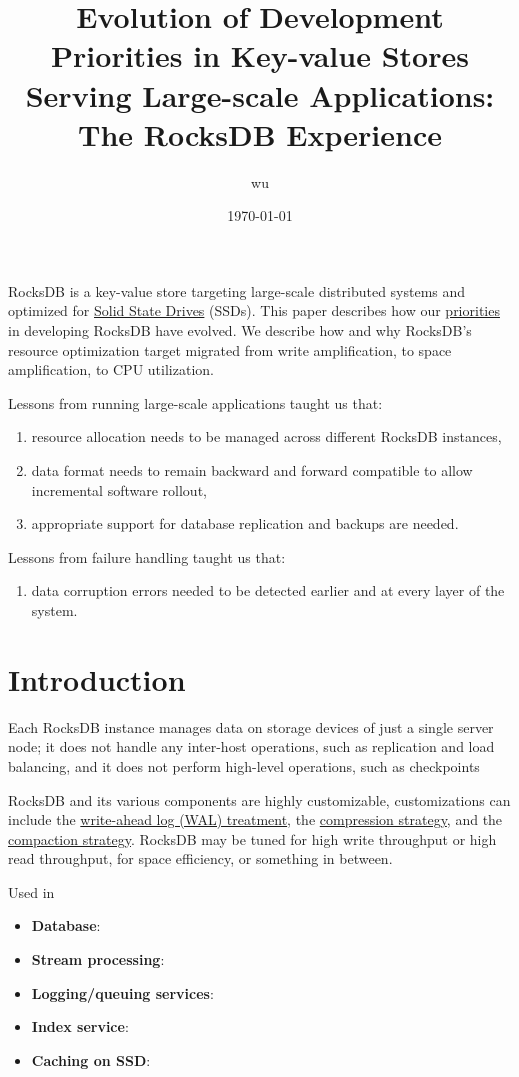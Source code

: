 \documentclass[11pt]{article}
\author{wu}
\date{\today}
\title{Evolution of Development Priorities in Key-value Stores Serving Large-scale Applications: The RocksDB Experience}
\begin{document}
\maketitle
RocksDB is a key-value store targeting large-scale distributed systems and optimized for \uline{Solid State Drives}
(SSDs). This paper describes how our \uline{priorities} in developing RocksDB have evolved. We describe how and why
RocksDB’s resource optimization target migrated from write amplification, to space amplification, to CPU
utilization.

Lessons from running large-scale applications taught us that:
\begin{enumerate}
\item resource allocation needs to be managed across different RocksDB instances,
\item data format needs to remain backward and forward compatible to allow incremental software rollout,
\item appropriate support for database replication and backups are needed.
\end{enumerate}

Lessons from failure handling taught us that:
\begin{enumerate}
\item data corruption errors needed to be detected earlier and at every layer of the system.
\end{enumerate}
\section{Introduction}
\label{sec:org644f62f}
Each RocksDB instance manages data on storage devices of just a single server node; it does not handle
any inter-host operations, such as replication and load balancing, and it does not perform
high-level operations, such as checkpoints

RocksDB and its various components are highly customizable, customizations can include the
\uline{write-ahead log (WAL) treatment}, the \uline{compression strategy}, and the \uline{compaction strategy}. RocksDB may be
tuned for high write throughput or high read throughput, for space efficiency, or something in
between.


Used in
\begin{itemize}
\item \textbf{Database}:
\item \textbf{Stream processing}:
\item \textbf{Logging/queuing services}:
\item \textbf{Index service}:
\item \textbf{Caching on SSD}:
\end{itemize}
\end{document}
